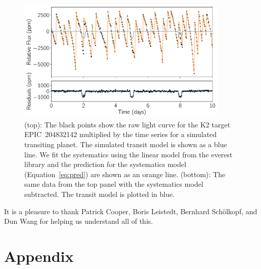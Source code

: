 \documentclass[modern]{rnaastex}
\newcommand{\project}[1]{\textsf{#1}}
\newcommand{\figurelabel}[1]{\label{fig:#1}}
\renewcommand{\eqref}[1]{\ref{eq:#1}}
\newcommand{\eqalt}[1]{Equation~\eqref{#1}}
\begin{document}
\begin{figure}[h!]
\begin{center}
\includegraphics[width=0.9\textwidth]{figure.pdf}
\caption{%
(top): The black points show the raw light curve for the \project{K2} target
    EPIC~204832142 multiplied by the time series for a simulated transiting
    planet.
    The simulated transit model is shown as a blue line.
    We fit the systematics using the linear model from the \project{everest}
    library \citep{Luger:2016, Luger:2017} and the prediction for the
    systematics model (\eqalt{pred}) are shown as an orange line.
(bottom): The same data from the top panel with the systematics model
    subtracted.
    The transit model is plotted in blue.
\figurelabel{figure}}
\end{center}
\end{figure}

\acknowledgements
It is a pleasure to thank
  Patrick Cooper,
  Boris Leistedt,
  Bernhard Sch\"olkopf, and
  Dun Wang
for helping us understand all of this.



\section{Appendix}
\end{document}
